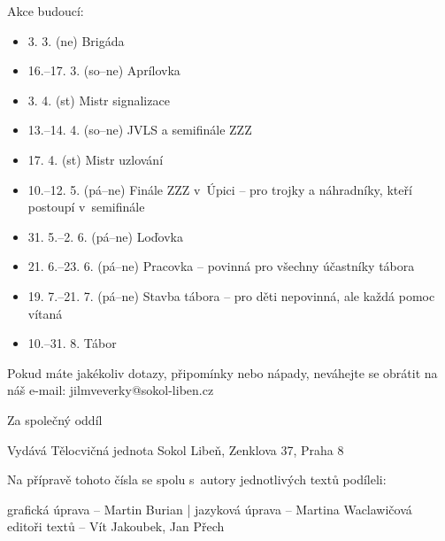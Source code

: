 \documentclass[11pt]{article}
\begin{document}
\vspace*{6pt}
\noindent
Akce budoucí:
\begin{itemize}[
  itemsep=-3pt,
  leftmargin=2em,
  itemindent=-1em
]
  \item[] 3. 3. (ne) Brigáda
  \item[] 16.–17. 3. (so–ne) Aprílovka
  \item[] 3. 4. (st) Mistr signalizace
  \item[] 13.–14. 4. (so–ne) JVLS a semifinále ZZZ
  \item[] 17. 4. (st) Mistr uzlování
  \item[] 10.–12. 5. (pá–ne) Finále ZZZ v~Úpici – pro trojky a náhradníky, kteří postoupí v~semifinále
  \item[] 31. 5.–2. 6. (pá–ne) Loďovka
  \item[] 21. 6.–23. 6. (pá–ne) Pracovka – povinná pro všechny účastníky tábora
  \item[] 19. 7.–21. 7. (pá–ne) Stavba tábora – pro děti nepovinná, ale každá pomoc vítaná
  \item[] 10.–31. 8. Tábor
\end{itemize}

\noindent
Pokud máte jakékoliv dotazy, připomínky nebo nápady, neváhejte se obrátit na náš e-mail: jilmveverky@sokol-liben.cz

Za společný oddíl
 
\signature{Bára Jeníková}{}

\clearpage

\pagestyle{blank}

\vspace*{96pt}

\pagecolor{sokolred}
\color{white}


\vspace*{\fill}

\begin{center}
Vydává Tělocvičná jednota Sokol Libeň, Zenklova 37, Praha 8

\vspace*{12pt}

Na přípravě tohoto čísla se spolu s~autory jednotlivých textů podíleli:

grafická úprava – Martin Burian | jazyková úprava – Martina Waclawičová \\ editoři textů – Vít Jakoubek, Jan Přech
\end{center}
\end{document}
